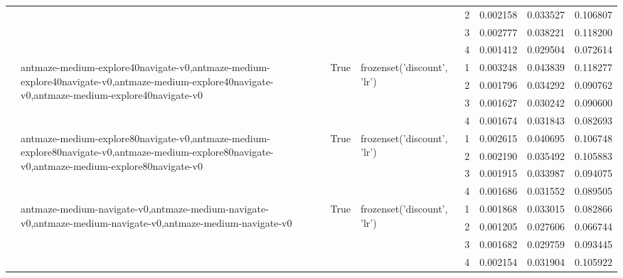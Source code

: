 \begin{tabular}{lllllrrr}
 &  &  &  & 2 & 0.002158 & 0.033527 & 0.106807 \\
 &  &  &  & 3 & 0.002777 & 0.038221 & 0.118200 \\
 &  &  &  & 4 & 0.001412 & 0.029504 & 0.072614 \\
\cline{2-8} \cline{3-8} \cline{4-8}
 & \multirow[t]{4}{*}{antmaze-medium-explore40navigate-v0,antmaze-medium-explore40navigate-v0,antmaze-medium-explore40navigate-v0,antmaze-medium-explore40navigate-v0} & \multirow[t]{4}{*}{True} & \multirow[t]{4}{*}{frozenset({'discount', 'lr'})} & 1 & 0.003248 & 0.043839 & 0.118277 \\
 &  &  &  & 2 & 0.001796 & 0.034292 & 0.090762 \\
 &  &  &  & 3 & 0.001627 & 0.030242 & 0.090600 \\
 &  &  &  & 4 & 0.001674 & 0.031843 & 0.082693 \\
\cline{2-8} \cline{3-8} \cline{4-8}
 & \multirow[t]{4}{*}{antmaze-medium-explore80navigate-v0,antmaze-medium-explore80navigate-v0,antmaze-medium-explore80navigate-v0,antmaze-medium-explore80navigate-v0} & \multirow[t]{4}{*}{True} & \multirow[t]{4}{*}{frozenset({'discount', 'lr'})} & 1 & 0.002615 & 0.040695 & 0.106748 \\
 &  &  &  & 2 & 0.002190 & 0.035492 & 0.105883 \\
 &  &  &  & 3 & 0.001915 & 0.033987 & 0.094075 \\
 &  &  &  & 4 & 0.001686 & 0.031552 & 0.089505 \\
\cline{2-8} \cline{3-8} \cline{4-8}
 & \multirow[t]{4}{*}{antmaze-medium-navigate-v0,antmaze-medium-navigate-v0,antmaze-medium-navigate-v0,antmaze-medium-navigate-v0} & \multirow[t]{4}{*}{True} & \multirow[t]{4}{*}{frozenset({'discount', 'lr'})} & 1 & 0.001868 & 0.033015 & 0.082866 \\
 &  &  &  & 2 & 0.001205 & 0.027606 & 0.066744 \\
 &  &  &  & 3 & 0.001682 & 0.029759 & 0.093445 \\
 &  &  &  & 4 & 0.002154 & 0.031904 & 0.105922 \\
\cline{1-8} \cline{2-8} \cline{3-8} \cline{4-8}
\bottomrule
\end{tabular}
